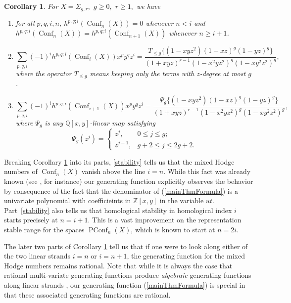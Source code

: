 \documentclass[11pt,reqno]{amsproc}
\numberwithin{equation}{section}
\newtheorem{corollary}[theorem]{Corollary}
\theoremstyle{definition}
\theoremstyle{remark}
\newcommand\Z{{\mathbb Z}}
\newcommand\Q{{\mathbb Q}}
\DeclareMathOperator{\Conf}{Conf}
\DeclareMathOperator{\PConf}{PConf}
\begin{document}
\begin{corollary}\label{cor:stability}
For $X=\Sigma_{g,r},$ $g\geq 0,$ $r\geq 1,$ we have
    \begin{enumerate}
        \item\label{stability} for all $p,q,i,n$, $h^{p,q;i}(\Conf_n(X))=0$ whenever $n<i$ and $h^{p,q;i}(\Conf_n(X))=h^{p,q;i}(\Conf_{n+1}(X))$ whenever $n \geq i+1$.
        \item\label{n=i} 
        \[ \sum_{p,q,i} (-1)^i h^{p,q;i}(\Conf_i(X)) x^p y^q z^i = \frac{T_{\leq g}\{(1 - xyz^2)(1 - xz)^g(1 - yz)^g\}}{(1+xyz)^{r-1}(1-x^2yz^2)^g(1-xy^2 z^2)^g},\]
        where the operator $T_{\leq g}$ means keeping only the terms with $z$-degree at most $g$.
        \item\label{n=i+1} \[ \sum_{p,q,i} (-1)^i h^{p,q;i}(\Conf_{i+1}(X)) x^p y^q z^i = \frac{\Psi_g\{(1 - xyz^2)(1 - xz)^g(1 - yz)^g\}}{(1+xyz)^{r-1}(1-x^2yz^2)^g(1-xy^2 z^2)^g},\]
        where $\Psi_g$ is any $\Q[x,y]$-linear map satisfying 
        \begin{equation}
        \Psi_g(z^j)=\begin{cases}
        z^j,& 0\leq j\leq g;\\
        z^{j-1},& g+2\leq j\leq 2g+2.
        \end{cases}
        \end{equation}
    \end{enumerate}
\end{corollary}

Breaking Corollary \ref{cor:stability} into its parts, \ref{stability} tells us that the mixed Hodge numbers of $\Conf_n(X)$ vanish above the line $i = n$. While this fact was already known (see \cite{miller2019higher}, for instance) our generating function explicitly observes the behavior by consequence of the fact that the denominator of (\ref{mainThmFormula}) is a univariate polynomial with coefficieints in $\Z[x,y]$ in the variable $ut$. Part~\ref{stability} also tells us that homological stability in homological index $i$ starts precisely at $n = i+1$. This is a vast improvement on the representation stable range for the spaces $\PConf_n(X)$, which is known to start at $n = 2i$.

The later two parts of Corollary \ref{cor:stability} tell us that if one were to look along either of the two linear strands $i = n$ or $i = n+1$, the generating function for the mixed Hodge numbers remains rational. Note that while it is always the case that rational multi-variate generating functions produce \emph{algebraic} generating functions along linear strands \cite[Chapter 6]{stanley1990enumerative}, our generating function (\ref{mainThmFormula}) is special in that these associated generating functions are rational.
\end{document}
